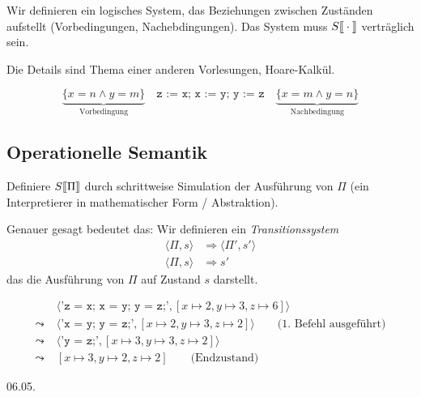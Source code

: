 Wir definieren ein logisches System, das Beziehungen zwischen Zuständen aufstellt (Vorbedingungen, Nachebdingungen). Das System muss $S\mathrm{[}\kern-.14em\mathrm{[}\cdot\mathrm{]}\kern-.14em\mathrm{]}$ verträglich sein.

Die Details sind Thema einer anderen Vorlesungen, \zb{} Hoare-Kalkül.

\begin{example}
    \[
    \underbrace{\{ x = n \wedge y = m \}}_{\text{Vorbedingung}} \quad \texttt{z := x; x := y; y := z} \quad \underbrace{\{ x = m \wedge y = n \}}_{\text{Nachbedingung}}
    \]
\end{example}



\subsection{Operationelle Semantik}

Definiere $S\mathrm{[}\kern-.14em\mathrm{[}\Pi\mathrm{]}\kern-.14em\mathrm{]}$ durch schrittweise Simulation der Ausführung von $\Pi$ (ein Interpretierer in mathematischer Form / Abstraktion).

Genauer gesagt bedeutet das: Wir definieren ein \emph{Transitionssystem}
\begin{align*}
    \langle \Pi, s \rangle & \Rightarrow \langle \Pi', s' \rangle \\
    \langle \Pi, s \rangle & \Rightarrow s'
\end{align*}
das die Ausführung von $\Pi$ auf Zustand $s$ darstellt.

\begin{example}
    \begin{align*}
        & \langle \texttt{'z = x; x = y; y = z;'}, [x \mapsto 2, y \mapsto 3, z \mapsto 6] \rangle \\
        \leadsto \; & \langle \texttt{'x = y; y = z;'}, [x \mapsto 2, y \mapsto 3, z \mapsto 2] \rangle \quad\quad \text{(1. Befehl ausgeführt)} \\
        \leadsto \; & \langle \texttt{'y = z;'}, [x \mapsto 3, y \mapsto 3, z \mapsto 2] \rangle \\
        \leadsto \; & [x \mapsto 3, y \mapsto 2, z \mapsto 2] \quad\quad \text{(Endzustand)}
    \end{align*}
\end{example}



\newpage
\hfill 06.05.


